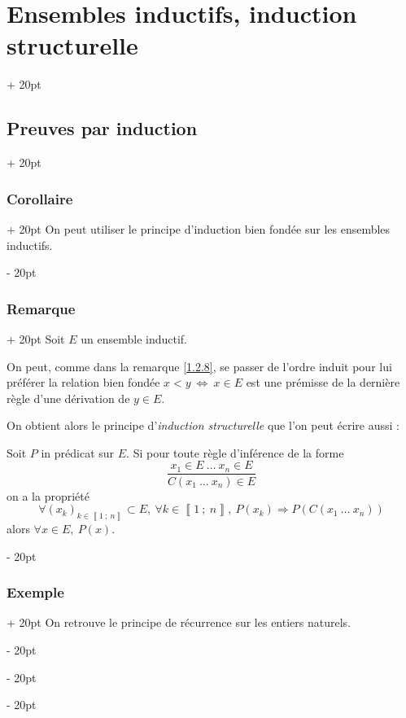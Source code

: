 \documentclass[a4paper, 12pt, twoside]{article}
\newcommand{\nset}[2]{\left\llbracket #1\ ;\ #2 \right\rrbracket}
\newcommand{\ssi}{\ \Leftrightarrow \ }
\newcommand{\ind}[1][20pt]{\advance\leftskip + #1}
\newcommand{\deind}[1][20pt]{\advance\leftskip - #1}
\newenvironment{indt}[2][20pt]{#2 \par \ind[#1]}{\par \deind} %
\begin{document}
\begin{indt}{\section{Ensembles inductifs, induction structurelle}}
\begin{indt}{\subsection{Preuves par induction}}
            \vspace{12pt}
            
            \begin{indt}{\subsubsection{Corollaire}}
                On peut utiliser le principe d'induction bien fondée sur les ensembles inductifs.
            \end{indt}
            
            \vspace{12pt}
            
            \begin{indt}{\subsubsection{Remarque}}
                Soit $E$ un ensemble inductif.
                
                On peut, comme dans la remarque \ref{1.2.8}, se passer de l'ordre induit pour lui préférer la relation bien fondée $x < y \ssi x \in E$ est une prémisse de la dernière règle d'une dérivation de $y \in E$.
                
                On obtient alors le principe d'\textit{induction structurelle} que l'on peut écrire aussi :
                
                Soit $P$ in prédicat sur $E$.
                Si pour toute règle d'inférence de la forme
                    \[ \dfrac{x_1 \in E\ \ldots\ x_n \in E}{C(x_1\ \ldots\ x_n) \in E} \]
                on a la propriété
                    \[ \forall (x_k)_{k \in \nset 1 n} \subset E,\ \forall k \in \nset 1 n,\ P(x_k) \Rightarrow P(C(x_1\ \ldots\ x_n)) \]
                alors $\forall x \in E,\ P(x)$.
            \end{indt}
            
            \vspace{12pt}
            
            \begin{indt}{\subsubsection{Exemple}}
                On retrouve le principe de récurrence sur les entiers naturels.
                
                \vspace{6pt}
                

\end{indt}
\end{indt}
\end{indt}
\end{document}
